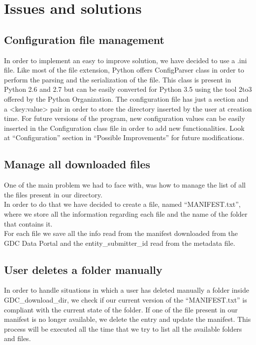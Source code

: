 \documentclass[hidelinks,12pt]{article}
\begin{document}
\clearpage


\section{Issues and solutions}


\subsection{Configuration file management}
In order to implement an easy to improve solution, we have decided to use a .ini file. Like most of the file extension, Python offers ConfigParser class in order to perform the parsing and the serialization of the file. This class is present in Python 2.6 and 2.7 but can be easily converted for Python 3.5 using the tool 2to3 offered by the Python Organization.
The configuration file has just a section and a <key:value> pair in order to store the directory inserted by the user at creation time. For future versions of the program, new configuration values can be easily inserted in the Configuration 
class file in order to add new functionalities.
Look at ``Configuration'' section in ``Possible Improvements'' for future modifications.


\subsection{Manage all downloaded files}
One of the main problem we had to face with, was how to manage the list of all the files present in our directory. \\ In order to do that we have decided to create a file, named ``MANIFEST.txt'', where we store all the information regarding each file and the name of the folder that contains it.\\
For each file we save all the info read from the manifest downloaded from the GDC Data Portal and the entity\_submitter\_id read from the metadata file.


\subsection{User deletes a folder manually}
In order to handle situations in which a user has deleted manually a folder inside GDC\_download\_dir, we check if our current version of the ``MANIFEST.txt'' is compliant with the current state of the folder. If one of the file present in our manifest is no longer available, we delete the entry and update the manifest. This process will be executed all the time that we try to list all the available folders and files.
\end{document}

